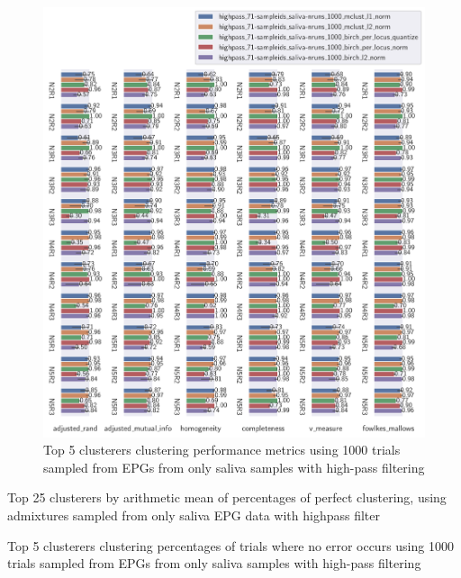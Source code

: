 \begin{theappendices}
\begin{figure}[htbp]
\centering
\includegraphics[width=\textwidth]{./figures/clust_comparison/highpass_71-sampleids_saliva-nruns_1000_top_5_clusterers_by_metrics.pdf}
\caption{Top 5 clusterers clustering performance metrics using 1000 trials sampled from EPGs from only saliva samples with high-pass filtering}
\label{appendix:fig:highpass_71-sampleids_saliva-nruns_1000_top_5_clusterers_by_metrics}
\end{figure}

\begin{table}[htbp]
\centering
{}
\caption{Top 25 clusterers by arithmetic mean of percentages of perfect clustering, using admixtures sampled from only saliva EPG data with highpass filter}
\label{appendix:table:top_25_not_ensemble_clusterers_by_binomial_confidence_highpass_71-sampleids_saliva-nruns_1000}
\end{table}

\begin{table}[htbp]
\centering
{}
\caption{Top 5 clusterers clustering percentages of trials where no error occurs using 1000 trials sampled from EPGs from only saliva samples with high-pass filtering}
\label{appendix:table:highpass_71-sampleids_saliva-nruns_1000_top_5_clusterers_by_binomial_confidence}
\end{table}


\end{theappendices}
